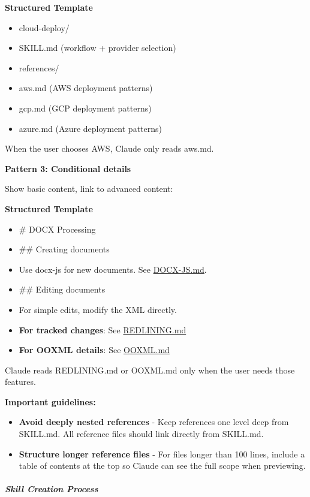 \documentclass[11pt]{article}
\begin{document}
\textbf{Structured Template}
\begin{itemize}[leftmargin=*,itemsep=2pt,topsep=2pt]
\item {} cloud-deploy/
\item {} SKILL.md (workflow + provider selection)
\item {} references/
\item {} aws.md (AWS deployment patterns)
\item {} gcp.md (GCP deployment patterns)
\item {} azure.md (Azure deployment patterns)
\end{itemize}

When the user chooses AWS, Claude only reads aws.md.


\textbf{Pattern 3: Conditional details}


Show basic content, link to advanced content:


\textbf{Structured Template}
\begin{itemize}[leftmargin=*,itemsep=2pt,topsep=2pt]
\item {} \# DOCX Processing
\item {} \#\# Creating documents
\item {} Use docx-js for new documents. See \href{DOCX-JS.md}{DOCX-JS.md}.
\item {} \#\# Editing documents
\item {} For simple edits, modify the XML directly.
\item {} \textbf{For tracked changes}: See \href{REDLINING.md}{REDLINING.md}
\item {} \textbf{For OOXML details}: See \href{OOXML.md}{OOXML.md}
\end{itemize}

Claude reads REDLINING.md or OOXML.md only when the user needs those features.


\textbf{Important guidelines:}


\begin{itemize}[leftmargin=*,itemsep=2pt,topsep=2pt]
\item {} \textbf{Avoid deeply nested references} - Keep references one level deep from SKILL.md. All reference files should link directly from SKILL.md.
\item {} \textbf{Structure longer reference files} - For files longer than 100 lines, include a table of contents at the top so Claude can see the full scope when previewing.
\end{itemize}

\subparagraph{Skill Creation Process}\mbox{}\par
\end{document}
